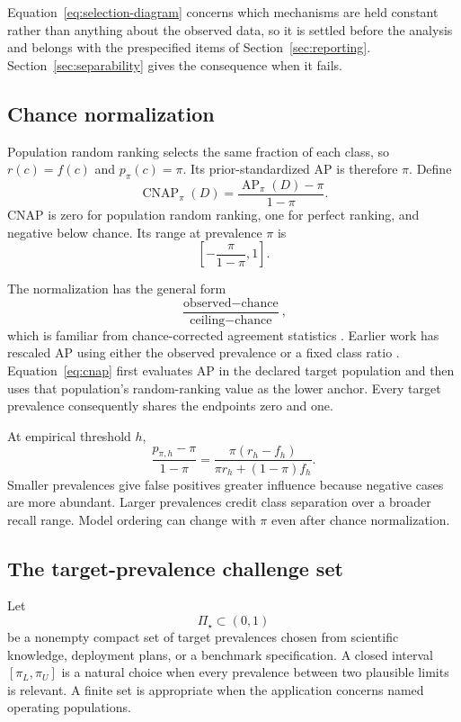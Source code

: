 \documentclass[11pt]{article}
\newcommand{\AP}{\operatorname{AP}}
\newcommand{\CNAP}{\operatorname{CNAP}}
\newcommand{\PSet}{\Pi_\star}
\theoremstyle{remark}
\begin{document}
Equation~\eqref{eq:selection-diagram} concerns which mechanisms are held constant rather than anything about the observed data, so it is settled before the analysis and belongs with the prespecified items of Section~\ref{sec:reporting}. Section~\ref{sec:separability} gives the consequence when it fails.

\subsection{Chance normalization}

Population random ranking selects the same fraction of each class, so $r(c)=f(c)$ and $p_\pi(c)=\pi$. Its prior-standardized AP is therefore $\pi$. Define
\begin{equation}
\CNAP_\pi(D)
=
\frac{\AP_\pi(D)-\pi}{1-\pi}.
\label{eq:cnap}
\end{equation}
CNAP is zero for population random ranking, one for perfect ranking, and negative below chance. Its range at prevalence $\pi$ is
\[
\left[-\frac{\pi}{1-\pi},1\right].
\]

The normalization has the general form
\[
\frac{\text{observed}-\text{chance}}
{\text{ceiling}-\text{chance}},
\]
which is familiar from chance-corrected agreement statistics \cite{cohen1960coefficient}. Earlier work has rescaled AP using either the observed prevalence or a fixed class ratio \cite{suyuan2015relationship,bestgen2021fisher}. Equation~\eqref{eq:cnap} first evaluates AP in the declared target population and then uses that population's random-ranking value as the lower anchor. Every target prevalence consequently shares the endpoints zero and one.

At empirical threshold $h$,
\begin{equation}
\frac{p_{\pi,h}-\pi}{1-\pi}
=
\frac{\pi(r_h-f_h)}
{\pi r_h+(1-\pi)f_h}.
\label{eq:threshold-cnap}
\end{equation}
Smaller prevalences give false positives greater influence because negative cases are more abundant. Larger prevalences credit class separation over a broader recall range. Model ordering can change with $\pi$ even after chance normalization.

\subsection{The target-prevalence challenge set}

Let
\[
\PSet\subset(0,1)
\]
be a nonempty compact set of target prevalences chosen from scientific knowledge, deployment plans, or a benchmark specification. A closed interval $[\pi_L,\pi_U]$ is a natural choice when every prevalence between two plausible limits is relevant. A finite set is appropriate when the application concerns named operating populations.
\end{document}
